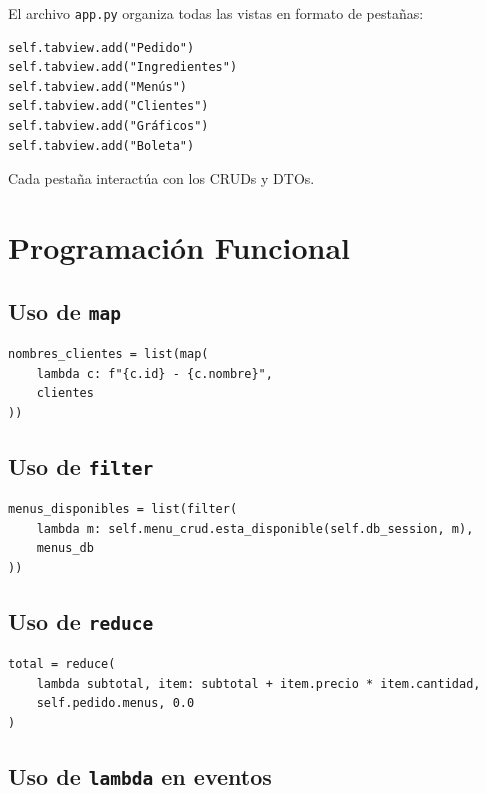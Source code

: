\documentclass[11pt,letterpaper]{article}
\begin{document}
El archivo \texttt{app.py} organiza todas las vistas en formato de pestañas:

\begin{verbatim}
self.tabview.add("Pedido")
self.tabview.add("Ingredientes")
self.tabview.add("Menús")
self.tabview.add("Clientes")
self.tabview.add("Gráficos")
self.tabview.add("Boleta")
\end{verbatim}

Cada pestaña interactúa con los CRUDs y DTOs.

\section{Programación Funcional}

\subsection{Uso de \texttt{map}}

\begin{verbatim}
nombres_clientes = list(map(
    lambda c: f"{c.id} - {c.nombre}",
    clientes
))
\end{verbatim}

\subsection{Uso de \texttt{filter}}

\begin{verbatim}
menus_disponibles = list(filter(
    lambda m: self.menu_crud.esta_disponible(self.db_session, m),
    menus_db
))
\end{verbatim}

\subsection{Uso de \texttt{reduce}}

\begin{verbatim}
total = reduce(
    lambda subtotal, item: subtotal + item.precio * item.cantidad,
    self.pedido.menus, 0.0
)
\end{verbatim}

\subsection{Uso de \texttt{lambda} en eventos}
\end{document}
